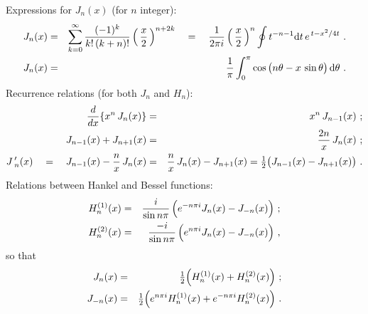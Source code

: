 \documentclass[12pt]{article}
\def\dd{{\rm d}}  \def\bra{\langle}   \def\ket{\rangle}
\def\fract#1#2{{\textstyle{#1\over#2}}}
\def\ffract#1#2{\raise .3 em\hbox{$\scriptstyle#1$}\kern-.25em/
                \kern-.2em\lower .2 em \hbox{$\scriptstyle#2$}}
\def\half{\fract12} \def\quart{\fract14} \def\halff{\ffract12}
\def\iz{\quad = \quad}
\renewcommand{\^}[1]{\hat{#1}}
\newcommand{\be}{\begin{eqnarray}}
\newcommand{\ee}{\end{eqnarray}}
\newcommand{\nn}{\nonumber\\}
\begin{document}
 Expressions for \(J_n(x)\) (for \(n\)
integer): \be J_n(x)&=&\sum_{k=0}^\infty{(-1)^k\over
k!\,(k+n)!}\,\Big(\,{x\over2}\,\Big)^{n+2k}\iz {1\over 2\pi
i}\,\Big(\,{x\over2}\,\Big)^n\oint t^{-n-1}\dd t\,e^{\,t- x^2/4t}
\ . \\ J_n(x)&=& {1\over\pi}\int_0^\pi\cos\big(n\th-x\,
\sin\th\big)\,\dd\th\ . \ee
 Recurrence relations (for both \(J_n\) and \(H_n\)):
 \be\frac{d}{dx}\{x^n\,J_n(x)\}&=& x^n\,J_{n-1}(x)\ ;\nn
  J_{n-1}(x)+J_{n+1}(x) &=& {2n\over x}\,J_n(x)\ ;\nn
 J\,'_n(x)\iz J_{n-1}(x)-{n\over x}\,J_n(x) &=& {n\over x}\,J_n(x)
-J_{n+1}(x) = \vphantom{n\over x}
\half\big(J_{n-1}(x)-J_{n+1}(x)\big)\
 .\ee
  Relations between Hankel and Bessel functions: \be
H^{(1)}_n(x)&=&{i\over \sin n\pi}\,\Big(e^{-n\pi
i}J_n(x)-J_{-n}(x)\Big)\ ;\nn H^{(2)}_n(x)&=&{-i\over \sin
n\pi}\,\Big(e^{n\pi i}J_n(x)-J_{-n}(x)\Big)\ ,\ee so that \be
J_n(x)&=&\half\Big(H^{(1)}_n(x)+H^{(2)}_n(x)\Big)\ ;\nn
J_{-n}(x)&=&\half\Big(e^{n\pi i}H_n^{(1)}(x)+e^{-n\pi
i}H_n^{(2)}(x)\Big)\ .\ee\pagebreak[4]
\end{document}
